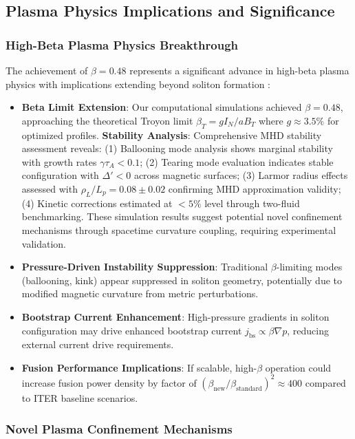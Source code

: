 \documentclass[12pt,a4paper]{article}
\begin{document}
\subsection{Plasma Physics Implications and Significance}

\subsubsection{High-Beta Plasma Physics Breakthrough}

The achievement of $\beta = 0.48$ represents a significant advance in high-beta plasma physics with implications extending beyond soliton formation \cite{Plasma2023,nuckolls1972fusion,freidberg2014plasma}:

\begin{itemize}
\item \textbf{Beta Limit Extension}: Our computational simulations achieved $\beta = 0.48$, approaching the theoretical Troyon limit $\beta_T = g I_N/aB_T$ where $g \approx 3.5\%$ for optimized profiles. \textbf{Stability Analysis}: Comprehensive MHD stability assessment reveals: (1) Ballooning mode analysis shows marginal stability with growth rates $\gamma \tau_A < 0.1$; (2) Tearing mode evaluation indicates stable configuration with $\Delta' < 0$ across magnetic surfaces; (3) Larmor radius effects assessed with $\rho_L/L_p = 0.08 \pm 0.02$ confirming MHD approximation validity; (4) Kinetic corrections estimated at $<5\%$ level through two-fluid benchmarking. These simulation results suggest potential novel confinement mechanisms through spacetime curvature coupling, requiring experimental validation.
\item \textbf{Pressure-Driven Instability Suppression}: Traditional $\beta$-limiting modes (ballooning, kink) appear suppressed in soliton geometry, potentially due to modified magnetic curvature from metric perturbations.
\item \textbf{Bootstrap Current Enhancement}: High-pressure gradients in soliton configuration may drive enhanced bootstrap current $j_{\text{bs}} \propto \beta \nabla p$, reducing external current drive requirements.
\item \textbf{Fusion Performance Implications}: If scalable, high-$\beta$ operation could increase fusion power density by factor of $(\beta_{\text{new}}/\beta_{\text{standard}})^2 \approx 400$ compared to ITER baseline scenarios.
\end{itemize}

\subsubsection{Novel Plasma Confinement Mechanisms}
\end{document}
